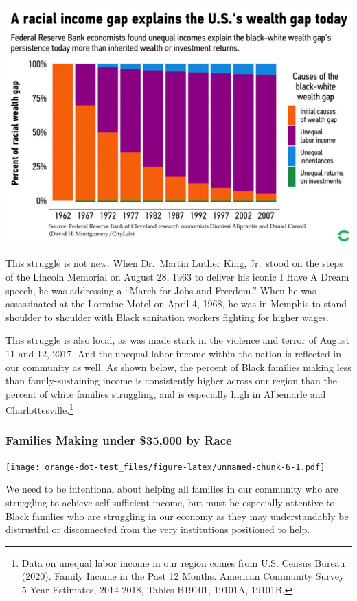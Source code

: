 \documentclass[
]{article}
\begin{document}
\begin{center}\includegraphics[width=0.8\linewidth]{images/IncomeGap} \end{center}

This struggle is not new. When Dr.~Martin Luther King, Jr.~stood on the
steps of the Lincoln Memorial on August 28, 1963 to deliver his iconic I
Have A Dream speech, he was addressing a ``March for Jobs and Freedom.''
When he was assassinated at the Lorraine Motel on April 4, 1968, he was
in Memphis to stand shoulder to shoulder with Black sanitation workers
fighting for higher wages.

This struggle is also local, as was made stark in the violence and
terror of August 11 and 12, 2017. And the unequal labor income within
the nation is reflected in our community as well. As shown below, the
percent of Black families making less than family-sustaining income is
consistently higher across our region than the percent of white families
struggling, and is especially high in Albemarle and
Charlottesville.\footnote{Data on unequal labor income in our region
  comes from U.S. Census Bureau (2020). Family Income in the Past 12
  Months. American Community Survey 5-Year Estimates, 2014-2018, Tables
  B19101, 19101A, 19101B.}

\hypertarget{families-making-under-35000-by-race}{%
\subsubsection{Families Making under \$35,000 by
Race}\label{families-making-under-35000-by-race}}

\texttt{[image: orange-dot-test\_files/figure-latex/unnamed-chunk-6-1.pdf]}

We need to be intentional about helping all families in our community
who are struggling to achieve self-sufficient income, but must be
especially attentive to Black families who are struggling in our economy
as they may understandably be distrustful or disconnected from the very
institutions positioned to help.
\end{document}
